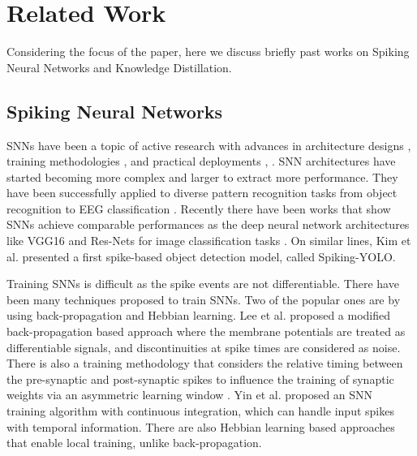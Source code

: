 \documentclass{article}
\begin{document}
\section{Related Work}
Considering the focus of the paper, here we discuss briefly past works on Spiking Neural Networks and Knowledge Distillation.

\subsection{Spiking Neural Networks}
SNNs have been a topic of active research with advances in architecture designs \cite{tavanaei2019deep}, training methodologies \cite{neil2016learning}, \cite{wu2019direct} and practical deployments \cite{ankit2017resparc}, \cite{lin2018mapping}. SNN architectures have started becoming more complex and larger to extract more performance. They have been successfully applied to diverse pattern recognition tasks from object recognition \cite{cao2015spiking} to EEG classification \cite{antelis2020spiking}. Recently there have been works that show SNNs achieve comparable performances as the deep neural network architectures like VGG16 and Res-Nets for image classification tasks \cite{sengupta2019going}. On similar lines, Kim et al. \cite{kim2019spiking} presented a first spike-based object detection model, called Spiking-YOLO.

Training SNNs is difficult as the spike events are not differentiable. There have been many techniques proposed to train SNNs. Two of the popular ones are by using back-propagation and Hebbian learning. Lee et al. \cite{lee2016training} proposed a modified back-propagation based approach where the membrane potentials are treated as differentiable signals, and discontinuities at spike times are considered as noise. There is also a training methodology that considers the relative timing between the pre-synaptic and post-synaptic spikes to influence the training of synaptic weights via an asymmetric learning window \cite{kempter1999hebbian}. Yin et al. \cite{yin2017algorithm} proposed an SNN training algorithm with continuous integration, which can handle input spikes with temporal information. There are also Hebbian learning \cite{gupta2009hebbian} based approaches that enable local training, unlike back-propagation.

\end{document}
